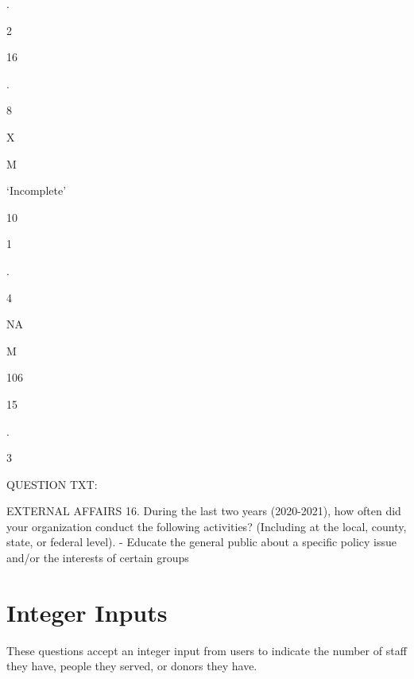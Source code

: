 \documentclass[
  letterpaper,
]{scrbook}
\begin{document}
.

2

16

.

8

X

M

`Incomplete'

10

1

.

4

NA

M

106

15

.

3

QUESTION TXT:

EXTERNAL AFFAIRS 16. During the last two years (2020-2021), how often
did your organization conduct the following activities? (Including at
the local, county, state, or federal level). - Educate the general
public about a specific policy issue and/or the interests of certain
groups

\chapter{Integer Inputs}\label{integer-inputs}

These questions accept an integer input from users to indicate the
number of staff they have, people they served, or donors they have.
\end{document}
